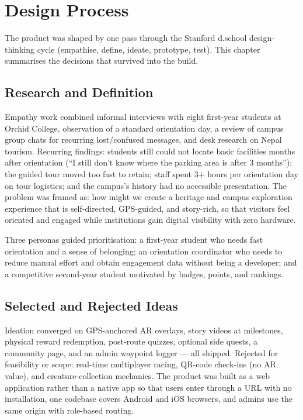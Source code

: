 \chapter{Design Process}
\label{ch:design-thinking}

The product was shaped by one pass through the Stanford d.school
design-thinking cycle (empathise, define, ideate, prototype, test). This
chapter summarises the decisions that survived into the build.

\section{Research and Definition}
Empathy work combined informal interviews with eight first-year students at
Orchid College, observation of a standard orientation day, a review of campus
group chats for recurring lost/confused messages, and desk research on Nepal
tourism. Recurring findings: students still could not locate basic facilities
months after orientation (``I still don't know where the parking area is
after 3 months''); the guided tour moved too fast to retain; staff spent
3+ hours per orientation day on tour logistics; and the campus's history had
no accessible presentation. The problem was framed as: how might we create a
heritage and campus exploration experience that is self-directed, GPS-guided,
and story-rich, so that visitors feel oriented and engaged while institutions
gain digital visibility with zero hardware.

Three personas guided prioritisation: a first-year student who needs fast
orientation and a sense of belonging; an orientation coordinator who needs to
reduce manual effort and obtain engagement data without being a developer;
and a competitive second-year student motivated by badges, points, and
rankings.

\section{Selected and Rejected Ideas}
Ideation converged on GPS-anchored AR overlays, story videos at milestones,
physical reward redemption, post-route quizzes, optional side quests, a
community page, and an admin waypoint logger --- all shipped. Rejected for
feasibility or scope: real-time multiplayer racing, QR-code check-ins (no AR
value), and creature-collection mechanics. The product was built as a web
application rather than a native app so that users enter through a URL with
no installation, one codebase covers Android and iOS browsers, and admins use
the same origin with role-based routing.

